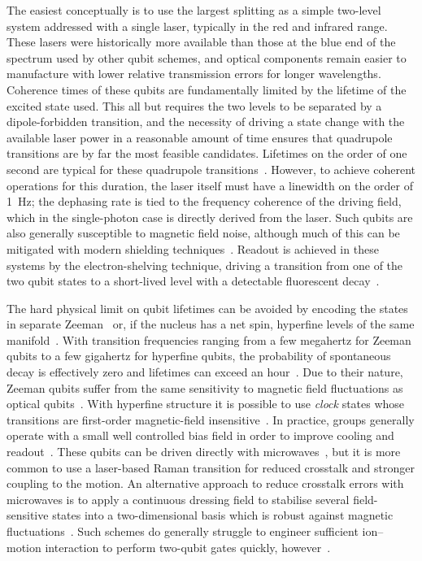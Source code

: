 The easiest conceptually is to use the largest splitting as a simple two-level system addressed with a single laser, typically in the red and infrared range.
These lasers were historically more available than those at the blue end of the spectrum used by other qubit schemes, and optical components remain easier to manufacture with lower relative transmission errors for longer wavelengths.
Coherence times of these qubits are fundamentally limited by the lifetime of the excited state used.
This all but requires the two levels to be separated by a dipole-forbidden transition, and the necessity of driving a state change with the available laser power in a reasonable amount of time ensures that quadrupole transitions are by far the most feasible candidates.
Lifetimes on the order of one second are typical for these quadrupole transitions~\cite{Barton2000}.
However, to achieve coherent operations for this duration, the laser itself must have a linewidth on the order of \qty{1}{\Hz}; the dephasing rate is tied to the frequency coherence of the driving field, which in the single-photon case is directly derived from the laser.
Such qubits are also generally susceptible to magnetic field noise, although much of this can be mitigated with modern shielding techniques~\cite{Ruster2016}.
Readout is achieved in these systems by the electron-shelving technique, driving a transition from one of the two qubit states to a short-lived level with a detectable fluorescent decay~\cite{Sauter1986,Nagourney1986}.

The hard physical limit on qubit lifetimes can be avoided by encoding the states in separate Zeeman~\cite{Home2006a,Poschinger2009} or, if the nucleus has a net spin, hyperfine levels of the same manifold~\cite{Monroe1995,Turchette1998}.
With transition frequencies ranging from a few megahertz for Zeeman qubits to a few gigahertz for hyperfine qubits, the probability of spontaneous decay is effectively zero and lifetimes can exceed an hour~\cite{Wang2017,Wang2021}.
Due to their nature, Zeeman qubits suffer from the same sensitivity to magnetic field fluctuations as optical qubits~\cite{Ruster2016}.
With hyperfine structure it is possible to use \emph{clock} states whose transitions are first-order magnetic-field insensitive~\cite{Olmschenk2007,Harty2014}.
In practice, groups generally operate with a small well controlled bias field in order to improve cooling and readout~\cite{Debnath2016,Pino2021}.
These qubits can be driven directly with microwaves~\cite{Mintert2001,Harty2016}, but it is more common to use a laser-based Raman transition for reduced crosstalk and stronger coupling to the motion.
An alternative approach to reduce crosstalk errors with microwaves is to apply a continuous dressing field to stabilise several field-sensitive states into a two-dimensional basis which is robust against magnetic fluctuations~\cite{Timoney2011,Webster2013}.
Such schemes do generally struggle to engineer sufficient ion--motion interaction to perform two-qubit gates quickly, however~\cite{Weidt2016}.

